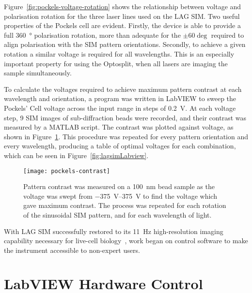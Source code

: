 Figure~\ref{fig:pockels-voltage-rotation} shows the relationship between voltage and polarisation rotation for the three laser lines used on the LAG SIM. 
Two useful properties of the Pockels cell are evident. 
Firstly, the device is able to provide a full \SI{360}{\degree} polarisation rotation, more than adequate for the $\pm60\deg$ required to align polarisation with the SIM pattern orientations. 
Secondly, to achieve a given rotation a similar voltage is required for all wavelengths. 
This is an especially important property for using the Optosplit, when all lasers are imaging the sample simultaneously. 

To calculate the voltages required to achieve maximum pattern contrast at each wavelength and orientation, a program was written in LabVIEW to sweep the Pockels' Cell voltage across the input range in steps of \SI{0.2}{\volt}. 
At each voltage step, 9 SIM images of sub-diffraction beads were recorded, and their contrast was measured by a MATLAB script. 
The contrast was plotted against voltage, as shown in Figure~\ref{fig:pockels-contrast}.
This procedure was repeated for every pattern orientation and every wavelength, producing a table of optimal voltages for each combination, which can be seen in Figure~\ref{fig:lagsimLabview}. 

\begin{figure}[htbp!]
\centering
\texttt{[image: pockels-contrast]}
\caption[LAG SIM: Measurements of a bead sample reveal the ideal Pockels cell voltages for maximum pattern contrast]{Pattern contrast was measured on a \SI{100}{\nano\metre} bead sample as the voltage was swept from \SIrange{-375}{375}{\volt} to find the voltage which gave maximum contrast. The process was repeated for each rotation of the sinusoidal SIM pattern, and for each wavelength of light. }
\label{fig:pockels-contrast}
\end{figure}

With LAG SIM successfully restored to its \SI{11}{\hertz} high-resolution imaging capability necessary for live-cell biology~\cite{strohl2017speed}, work began on control software to make the instrument accessible to non-expert users. 


\section{LabVIEW Hardware Control} \label{sec:labview}
